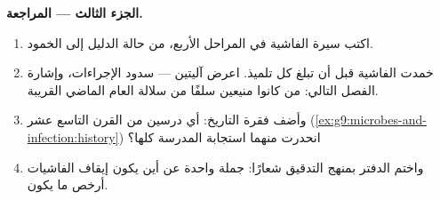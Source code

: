 \begin{problem}
\medskip\noindent\textbf{الجزء الثالث --- المراجعة.}
\begin{enumerate}[resume]
  \item اكتب سيرة الفاشية في المراحل الأربع، من حالة
        الدليل إلى الخمود.
  \item خمدت الفاشية قبل أن تبلغ كل تلميذ. اعرض آليتين
        --- سدود الإجراءات، وإشارة الفصل التالي: من
        كانوا منيعين سلفًا من سلالة العام الماضي
        القريبة.
  \item وأضف فقرة التاريخ: أي درسين من القرن التاسع عشر
        (\cref{ex:g9:microbes-and-infection:history})
        انحدرت منهما استجابة المدرسة كلها؟
  \item واختم الدفتر بمنهج التدقيق شعارًا: جملة واحدة عن
        أين يكون إيقاف الفاشيات أرخص ما يكون.
\end{enumerate}
\end{problem}

